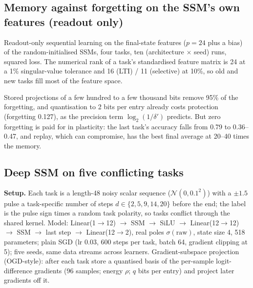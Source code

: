 \subsection{Memory against forgetting on the SSM's own features (readout only)}
Readout-only sequential learning on the final-state features ($p=24$ plus a bias) of the random-initialised SSMs, four tasks, ten (architecture $\times$ seed) runs, squared loss. The numerical rank of a task's standardised feature matrix is 24 at a 1\% singular-value tolerance and 16 (LTI) / 11 (selective) at 10\%, so old and new tasks fill most of the feature space.
\begin{table}[!htbp]
  \caption{Memory against forgetting, readout only.}
  \centering\scriptsize\setlength{\tabcolsep}{3.5pt}
\end{table}
Stored projections of a few hundred to a few thousand bits remove 95\% of the forgetting, and quantisation to 2 bits per entry already costs protection (forgetting 0.127), as the precision term $\log_2(1/\delta')$ predicts. But zero forgetting is paid for in plasticity: the last task's accuracy falls from 0.79 to 0.36--0.47, and replay, which can compromise, has the best final average at 20--40 times the memory.

\subsection{Deep SSM on five conflicting tasks}
\textbf{Setup.} Each task is a length-48 noisy scalar sequence ($\mathcal N(0,0.1^2)$) with a $\pm1.5$ pulse a task-specific number of steps $d\in\{2,5,9,14,20\}$ before the end; the label is the pulse sign times a random task polarity, so tasks conflict through the shared kernel. Model: Linear(1$\to$12) $\to$ SSM $\to$ SiLU $\to$ Linear(12$\to$12) $\to$ SSM $\to$ last step $\to$ Linear(12$\to$2), real poles $\sigma(\mathrm{raw})$, state size 4, 518 parameters; plain SGD (lr 0.03, 600 steps per task, batch 64, gradient clipping at 5); five seeds, same data streams across learners. Gradient-subspace projection (OGD-style): after each task store a quantised basis of the per-sample logit-difference gradients (96 samples; energy $\rho$; $q$ bits per entry) and project later gradients off it.

